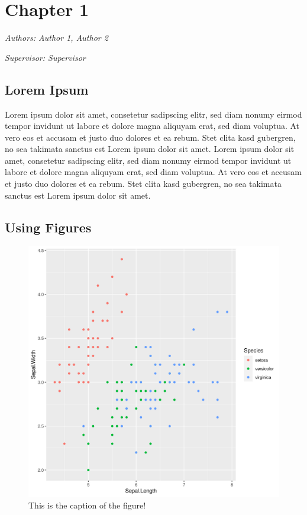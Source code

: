 \documentclass[
]{krantz}
\begin{document}
\hypertarget{chapter-1}{%
\chapter{Chapter 1}\label{chapter-1}}

\emph{Authors: Author 1, Author 2}

\emph{Supervisor: Supervisor}

\hypertarget{lorem-ipsum}{%
\section{Lorem Ipsum}\label{lorem-ipsum}}

Lorem ipsum dolor sit amet, consetetur sadipscing elitr, sed diam nonumy eirmod tempor invidunt ut labore et dolore magna aliquyam erat, sed diam voluptua. At vero eos et accusam et justo duo dolores et ea rebum. Stet clita kasd gubergren, no sea takimata sanctus est Lorem ipsum dolor sit amet. Lorem ipsum dolor sit amet, consetetur sadipscing elitr, sed diam nonumy eirmod tempor invidunt ut labore et dolore magna aliquyam erat, sed diam voluptua. At vero eos et accusam et justo duo dolores et ea rebum. Stet clita kasd gubergren, no sea takimata sanctus est Lorem ipsum dolor sit amet.

\citet{rlang}

\hypertarget{using-figures}{%
\section{Using Figures}\label{using-figures}}

\begin{figure}

{\centering \includegraphics[width=0.8\linewidth]{figures/01-chapter1/ch01-figure01} 

}

\caption{This is the caption of the figure!}\label{fig:ch01-figure01}
\end{figure}
\end{document}

